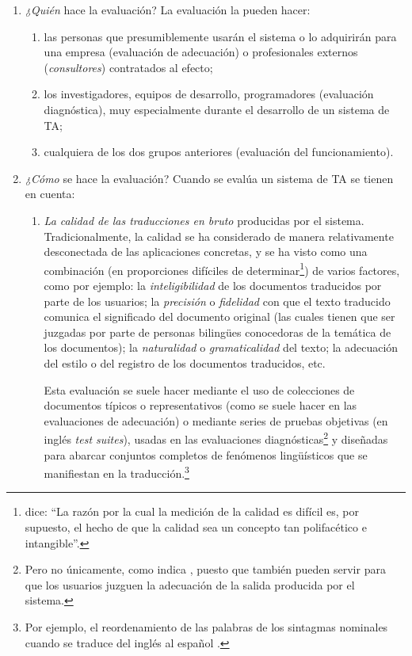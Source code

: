 \begin{enumerate}
\item \emph{¿Quién} hace la evaluación? La evaluación la pueden hacer: \begin{enumerate} \item las personas que presumiblemente usarán el sistema o lo adquirirán para una empresa (evaluación de adecuación) o profesionales externos (\emph{consultores}) contratados al efecto; \item los investigadores, equipos de desarrollo, programadores (evaluación diagnóstica), muy especialmente durante el desarrollo de un sistema de TA; \item cualquiera de los dos grupos anteriores (evaluación del funcionamiento). \end{enumerate} \item \emph{¿Cómo} se hace la evaluación? Cuando se evalúa un sistema de TA se tienen en cuenta: \begin{enumerate} \item \emph{La calidad de las traducciones en bruto} producidas por el sistema. Tradicionalmente, la calidad se ha considerado de manera relativamente desconectada de las aplicaciones concretas, y se ha visto como una combinación (en proporciones difíciles de determinar\footnote{\citet{minnis94j} dice: ``La razón por la cual la medición de la calidad es difícil es, por supuesto, el hecho de que la calidad sea un concepto tan polifacético e intangible''.}) de varios factores, como por ejemplo: la \emph{inteligibilidad} de los documentos traducidos por parte de los usuarios; la \emph{precisión} o \emph{fidelidad} con que el texto traducido comunica el significado del documento original (las cuales tienen que ser juzgadas por parte de personas bilingües conocedoras de la temática de los documentos); la \emph{naturalidad} o \emph{gramaticalidad} del texto; la adecuación del estilo o del registro de los documentos traducidos, etc. 

Esta evaluación se suele hacer mediante el uso de colecciones de documentos típicos o representativos (como se suele hacer en las evaluaciones de adecuación) o mediante series de pruebas objetivas (en inglés \emph{test suites}), usadas en las evaluaciones diagnósticas\footnote{Pero no únicamente, como indica \citet{lewis97j}, puesto que también pueden servir para que los usuarios juzguen la adecuación de la salida producida por el sistema.} y diseñadas para abarcar conjuntos completos de fenómenos lingüísticos que se manifiestan en la traducción.\footnote{Por ejemplo, el reordenamiento de las palabras de los sintagmas nominales cuando se traduce del inglés al español \citep{mira98j,forcada00p}.} 


\end{enumerate}
\end{enumerate}

